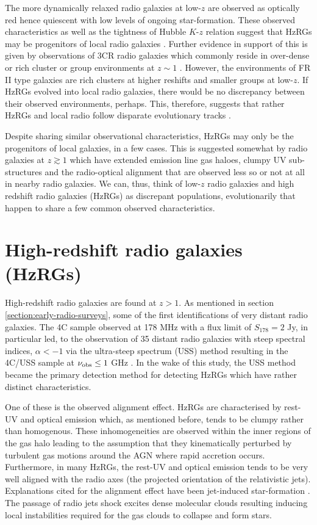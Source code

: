 \documentclass[10pt,a4paper]{article}
\begin{document}
The more dynamically relaxed radio galaxies at low-$z$ are observed as optically red hence quiescent with low levels of ongoing star-formation. These observed characteristics as well as the tightness of Hubble $K$-$z$ relation suggest that HzRGs may be progenitors of local radio galaxies \citep{Stanford1998}. Further evidence in support of this is given by observations of 3CR radio galaxies which commonly reside in over-dense or rich cluster or group environments at $z \sim 1$ \citep{Yates1989,HillLilly1991,Best2000b}. However, the environments of FR II type galaxies are rich clusters at higher reshifts and smaller groups at low-$z.$ If HzRGs evolved into local radio galaxies, there would be no discrepancy between their observed environments, perhaps. This, therefore, suggests that rather HzRGs and local radio follow disparate evolutionary tracks \cite{Best1998b}. 

Despite sharing similar observational characteristics, HzRGs may only be the progenitors of local galaxies, in a few cases. This is suggested somewhat by radio galaxies at $z \gtrsim 1$ which have extended emission line gas haloes, clumpy UV sub-structures and the radio-optical alignment that are observed less so or not at all in nearby radio galaxies. We can, thus, think of low-$z$ radio galaxies and high redshift radio galaxies (HzRGs) as discrepant populations, evolutionarily that happen to share a few common observed characteristics.  

\section{High-redshift radio galaxies (HzRGs)}  
High-redshift radio galaxies are found at $z > 1.$ As mentioned in section \ref{section:early-radio-surveys}, some of the first identifications of very distant radio galaxies. The 4C sample observed at 178 MHz with a flux limit of $S_{178}=2$ Jy, in particular led, to the observation of 35 distant radio galaxies with steep spectral indices, $\alpha < -1$ via the ultra-steep spectrum (USS) method resulting in the 4C/USS sample at $\nu_{\rm obs} \leq 1$ GHz \citep{ChambersMiley1990}. In the wake of this study, the USS method became the primary detection method for detecting HzRGs which have rather distinct characteristics. 

One of these is the observed alignment effect. HzRGs are characterised by rest-UV and optical emission which, as mentioned before, tends to be clumpy rather than homogenous. These inhomogeneities are observed within the inner regions of the gas halo leading to the assumption that they kinematically perturbed by turbulent gas motions around the AGN where rapid accretion occurs. Furthermore, in many HzRGs, the rest-UV and optical emission tends to be very well aligned with the radio axes (the projected orientation of the relativistic jets)\citep{Djorgovski1987,McCarthy1987b,Chambers1988b}. Explanations cited for the alignment effect have been jet-induced star-formation \citep{Rees1989,Bicknell2000}. The passage of radio jets shock excites dense molecular clouds resulting inducing local instabilities required for the gas clouds to collapse and form stars. 
\end{document}
